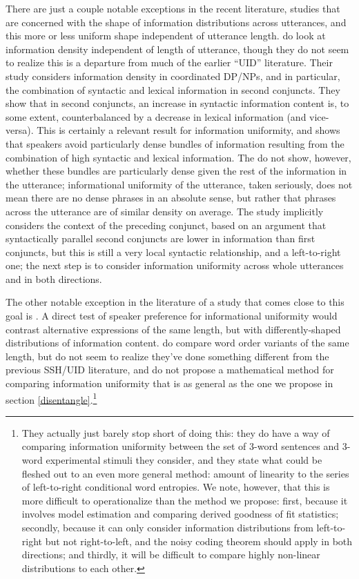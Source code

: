 \documentclass[12pt]{article}
\begin{document}
There are just a couple notable exceptions in the recent literature, studies that are concerned with the shape of information distributions across utterances, and this more or less uniform shape independent of utterance length. \citet{temperleygildea2015} do look at information density independent of length of utterance, though they do not seem to realize this is a departure from much of the earlier ``UID'' literature. Their study considers information density in coordinated DP/NPs, and in particular, the combination of syntactic and lexical information in second conjuncts. They show that in second conjuncts, an increase in syntactic information content is, to some extent, counterbalanced by a decrease in lexical information (and vice-versa). This is certainly a relevant result for information uniformity, and shows that speakers avoid particularly dense bundles of information resulting from the combination of high syntactic and lexical information. The do not show, however, whether these bundles are particularly dense given the rest of the information in the utterance; informational uniformity of the utterance, taken seriously, does not mean there are no dense phrases in an absolute sense, but rather that phrases across the utterance are of similar density on average.  The study implicitly considers the context of the preceding conjunct, based on an argument that syntactically parallel second conjuncts are lower in information than first conjuncts, but this is still a very local syntactic relationship, and a left-to-right one; the next step is to consider information uniformity across whole utterances and in both directions. 

The other notable exception in the literature of a study that comes close to this goal is \citet{mauritsetal2010}. A direct test of speaker preference for informational uniformity would contrast alternative expressions of the same length, but with differently-shaped distributions of information content. \citet{mauritsetal2010} do compare word order variants of the same length, but do not seem to realize they've done something different from the previous SSH/UID literature, and do not propose a mathematical method for comparing information uniformity that is as general as the one we propose in section \ref{disentangle}.\footnote{They actually just barely stop short of doing this: they do have a way of comparing information uniformity between the set of 3-word sentences and 3-word experimental stimuli they consider, and they state what could be fleshed out to an even more general method: amount of linearity to the series of left-to-right conditional word entropies. We note, however, that this is more difficult to operationalize than the method we propose: first, because it involves model estimation and comparing derived goodness of fit statistics; secondly, because it can only consider information distributions from left-to-right but not right-to-left, and the noisy coding theorem should apply in both directions; and thirdly, it will be difficult to compare highly non-linear distributions to each other.} 
\end{document}
